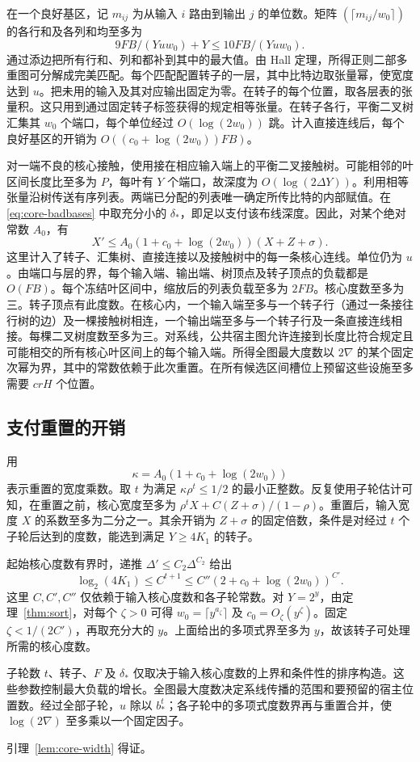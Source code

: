 在一个良好基区，记 \(m_{ij}\) 为从输入 \(i\) 路由到输出 \(j\) 的单位数。矩阵 \((\lceil m_{ij}/w_0\rceil)\) 的各行和及各列和均至多为 \[
 9FB/(Yuw_0)+Y\le10FB/(Yuw_0).
\] 通过添边把所有行和、列和都补到其中的最大值。由 Hall 定理，所得正则二部多重图可分解成完美匹配。每个匹配配置转子的一层，其中比特边取张量幂，使宽度达到 \(u\)。把未用的输入及其对应输出固定为零。在转子的每个位置，取各层表的张量积。这只用到通过固定转子标签获得的规定相等张量。在转子各行，平衡二叉树汇集其 \(w_0\) 个端口，每个单位经过 \(O(\log(2w_0))\) 跳。计入直接连线后，每个良好基区的开销为 \(O((c_0+\log(2w_0))FB)\)。

对一端不良的核心接触，使用接在相应输入端上的平衡二叉接触树。可能相邻的叶区间长度比至多为 \(P\)，每叶有 \(Y\) 个端口，故深度为 \(O(\log(2\Delta Y))\)。利用相等张量沿树传送有序列表。两端已分配的列表唯一确定所传比特的内部赋值。在 \eqref{eq:core-badbases} 中取充分小的 \(\delta_*\)，即足以支付该布线深度。因此，对某个绝对常数 \(A_0\)，有 \[
 X'\le A_0(1+c_0+\log(2w_0))(X+Z+\sigma).
\] 这里计入了转子、汇集树、直接连接以及接触树中的每一条核心连线。单位仍为 \(u\)。由端口与层的界，每个输入端、输出端、树顶点及转子顶点的负载都是 \(O(FB)\)。每个冻结叶区间中，缩放后的列表负载至多为 \(2FB\)。核心度数至多为三。转子顶点有此度数。在核心内，一个输入端至多与一个转子行（通过一条接往行树的边）及一棵接触树相连，一个输出端至多与一个转子行及一条直接连线相接。每棵二叉树度数至多为三。对系线，公共宿主图允许连接到长度比符合规定且可能相交的所有核心叶区间上的每个输入端。所得全图最大度数以 \(2\nabla\) 的某个固定次幂为界，其中的常数依赖于此次重置。在所有候选区间槽位上预留这些设施至多需要 \(c r H\) 个位置。

\subsection{支付重置的开销} 用 \[
 \kappa=A_0(1+c_0+\log(2w_0))
\] 表示重置的宽度乘数。取 \(t\) 为满足 \(\kappa\rho^t\le1/2\) 的最小正整数。反复使用子轮估计可知，在重置之前，核心宽度至多为 \(\rho^tX+C(Z+\sigma)/(1-\rho)\)。重置后，输入宽度 \(X\) 的系数至多为二分之一。其余开销为 \(Z+\sigma\) 的固定倍数，条件是对经过 \(t\) 个子轮后达到的度数，能选到满足 \(Y\ge4K_1\) 的转子。

起始核心度数有界时，递推 \(\Delta'\le C_2\Delta^{C_2}\) 给出 \[
 \log_2(4K_1)\le C^{t+1}
      \le C''(2+c_0+\log(2w_0))^{C'} .
\] 这里 \(C,C',C''\) 仅依赖于输入核心度数和各子轮常数。对 \(Y=2^y\)，由定理~\ref{thm:sort}，对每个 \(\zeta>0\) 可得 \(w_0=\lceil y^{a_\zeta}\rceil\) 及 \(c_0=O_\zeta(y^\zeta)\)。固定 \(\zeta<1/(2C')\)，再取充分大的 \(y\)。上面给出的多项式界至多为 \(y\)，故该转子可处理所需的核心度数。

子轮数 \(t\)、转子、\(F\) 及 \(\delta_*\) 仅取决于输入核心度数的上界和条件性的排序构造。这些参数控制最大负载的增长。全图最大度数决定系线传播的范围和要预留的宿主位置数。经过全部子轮，\(u\) 除以 \(b_*^t\)；各子轮中的多项式度数界再与重置合并，使 \(\log(2\nabla)\) 至多乘以一个固定因子。

引理~\ref{lem:core-width} 得证。

